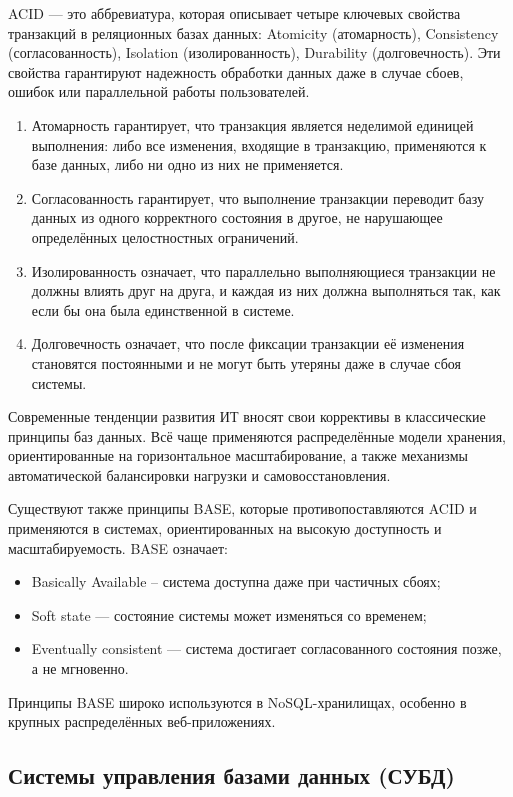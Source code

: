 ACID — это аббревиатура, которая описывает четыре ключевых свойства транзакций в реляционных базах данных: Atomicity (атомарность), Consistency (согласованность), Isolation (изолированность), Durability (долговечность). Эти свойства гарантируют надежность обработки данных даже в случае сбоев, ошибок или параллельной работы пользователей.
\begin{enumerate}
	\item Атомарность гарантирует, что транзакция является неделимой единицей выполнения: либо все изменения, входящие в транзакцию, применяются к базе данных, либо ни одно из них не применяется.
	\item Согласованность гарантирует, что выполнение транзакции переводит базу данных из одного корректного состояния в другое, не нарушающее определённых целостностных ограничений.
	\item Изолированность означает, что параллельно выполняющиеся транзакции не должны влиять друг на друга, и каждая из них должна выполняться так, как если бы она была единственной в системе.
	\item Долговечность означает, что после фиксации транзакции её изменения становятся постоянными и не могут быть утеряны даже в случае сбоя системы.
\end{enumerate}

Современные тенденции развития ИТ вносят свои коррективы в классические принципы баз данных. Всё чаще применяются распределённые модели хранения, ориентированные на горизонтальное масштабирование, а также механизмы автоматической балансировки нагрузки и самовосстановления.

Существуют также принципы BASE, которые противопоставляются ACID и применяются в системах, ориентированных на высокую доступность и масштабируемость. BASE означает:
\begin{itemize}
	\item Basically Available -- система доступна даже при частичных сбоях;
	\item Soft state — состояние системы может изменяться со временем;
	\item Eventually consistent — система достигает согласованного состояния позже, а не мгновенно.
 \end{itemize}
 
Принципы BASE широко используются в NoSQL-хранилищах, особенно в крупных распределённых веб-приложениях.
 
\subsection{Системы управления базами данных (СУБД)}

